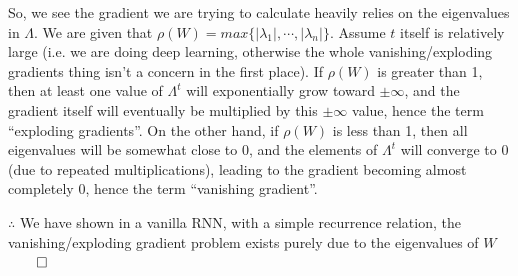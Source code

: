 \documentclass[11pt,english]{article}
\begin{document}
\begin{enumerate}
	So, we see the gradient we are trying to calculate heavily relies on the eigenvalues in $\Lambda$. We are given that $\rho(W) = max\{|\lambda_1|, \cdots, |\lambda_n|\}$. Assume $t$ itself is relatively large (i.e. we are doing deep learning, otherwise the whole vanishing/exploding gradients thing isn't a concern in the first place). If $\rho(W)$ is greater than 1, then at least one value of $\Lambda^t$ will exponentially grow toward $\pm\infty$, and the gradient itself will eventually be multiplied by this $\pm\infty$ value, hence the term ``exploding gradients''. On the other hand, if $\rho(W)$ is less than 1, then all eigenvalues will be somewhat close to 0, and the elements of $\Lambda^t$ will converge to 0 (due to repeated multiplications), leading to the gradient becoming almost completely 0, hence the term ``vanishing gradient''.
	
	$\therefore$ We have shown in a vanilla RNN, with a simple recurrence relation, the vanishing/exploding gradient problem exists purely due to the eigenvalues of $W$ $\qed$
\end{enumerate}
\end{document}
